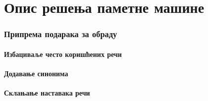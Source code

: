 \chapter{Опис решења паметне машине}
\subsection{Припрема подарака за обраду}
\subsubsection{Избациваље често коришћених речи}
\subsubsection{Додавање синонима}
\subsubsection{Склањање наставака речи}